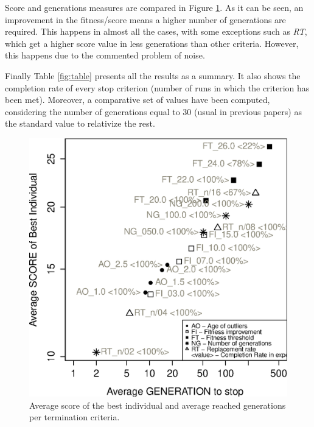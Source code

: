 \documentclass[runningheads,a4paper]{llncs}
\begin{document}
Score and generations measures are compared in Figure \ref{subfig:comparative}. As it can be seen, an improvement in the fitness/score means a higher number of generations are required. This happens in almost all the cases, with some exceptions such as \textit{RT}, which get a higher score value in less generations than other criteria. However, this happens due to the commented problem of noise.

Finally Table \ref{fig:table} presents all the results as a summary. It also shows the completion rate of every stop criterion (number of runs in which the criterion has been met). Moreover, a comparative set of values have been computed, considering the number of generations equal to 30 (usual in previous papers) as the standard value to relativize the rest.

\begin{figure}[h!tb]
	\begin{minipage}[b]{.50\columnwidth}
		\includegraphics[width=1\columnwidth]{imags/Comparative-log.eps}
		\caption{Average score of the best individual and average reached generations per termination criteria.}
		\label{subfig:comparative}
		\vfill
		\end{minipage}
\hfill
\begin{minipage}[b]{.44\columnwidth}

\end{minipage}
\end{figure}
\end{document}
